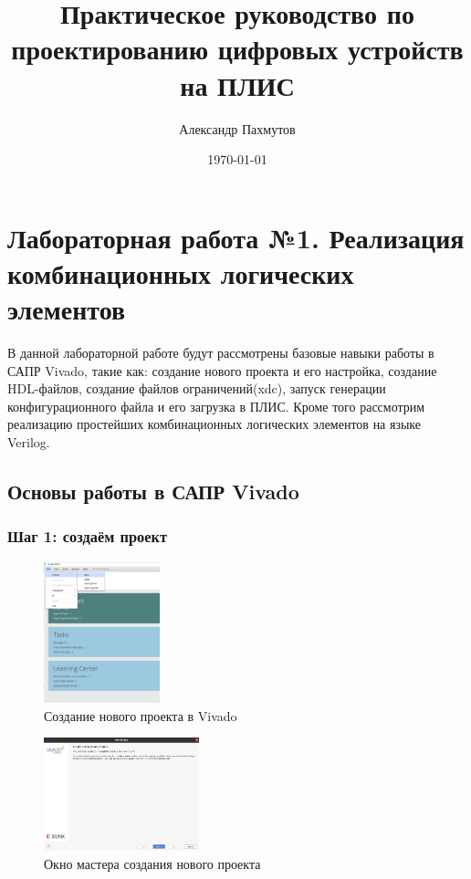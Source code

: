 \documentclass[a4paper,oneside ,10pt]{extreport}
\author{Александр Пахмутов}
\title{Практическое руководство по проектированию цифровых устройств на ПЛИС}
\date{\today}
\begin{document}
\maketitle
\thispagestyle{empty} 
\newpage 

\tableofcontents{}

\newpage

\chapter{Лабораторная работа №1. Реализация комбинационных логических элементов}

В данной лабораторной работе будут рассмотрены базовые навыки работы в САПР Vivado, такие как: создание нового проекта и 
его настройка, создание HDL-файлов, создание файлов ограничений(xdc), запуск генерации конфигурационного файла и его загрузка в ПЛИС.
Кроме того рассмотрим реализацию простейших комбинационных логических элементов на языке Verilog.

\section{Основы работы в САПР Vivado}

\subsection{Шаг 1: создаём проект}

\begin{figure}[!ht]
	\centering
	\includegraphics[width=0.3\textwidth]{image/m_3.png}
	\caption{Создание нового проекта в Vivado}
	\label{l1_new_prj}
\end{figure}

\begin{figure}[!ht]
	\centering
	\includegraphics[width=0.4\textwidth]{image/2}
	\caption{Окно мастера создания нового проекта}
	\label{l1_master}
\end{figure}
\end{document}
